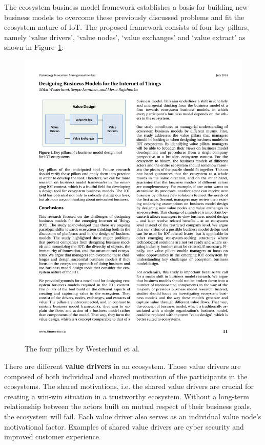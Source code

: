 		\vspace{-1em}
		The ecosystem business model framework establishes a basis for building new business models to overcome these previously discussed problems and fit the ecosystem nature of IoT. The proposed framework consists of four key pillars, namely `value drivers', `value nodes', `value exchanges' and `value extract' as shown in Figure~\ref{Westerlund pillars}:

			\begin{figure}[ht]
			    \begin{center}
			    \includegraphics[scale=1.2]{Talk11/westerlundpillars.pdf}
			    \end{center}
			    \caption{The four pillars by Westerlund et al. \cite{westerlund}}
			    \label{Westerlund pillars}
			\end{figure}
		There are different \textbf{value drivers} in an ecosystem. Those value drivers are composed of both individual and shared motivation of the participants in the ecosystems. The shared motivations, i.e. the shared value drivers are crucial for creating a win-win situation in a trustworthy ecosystem. Without a long-term relationship between the actors built on mutual respect of their business goals, the ecosystem will fail. Each value driver also serves as an individual value node's motivational factor. Examples of shared value drivers are cyber security and improved customer experience.\\
